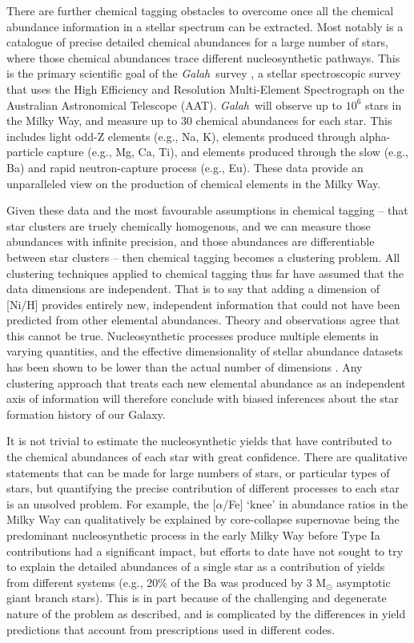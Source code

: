 \documentclass[twocolumn]{aastex62}
\newcommand{\project}[1]{\textsl{#1}}
\newcommand{\Galah}{\project{Galah}}
\begin{document}
There are further chemical tagging obstacles to overcome once all the chemical 
abundance information in a stellar spectrum can be extracted. Most notably is a 
catalogue of precise detailed chemical abundances for a large number of stars,
where those chemical abundances trace different nucleosynthetic pathways.
This is the primary scientific goal of the \Galah\ survey \citep{DeSilva:2015,Martell:2017,Buder:2018},
a stellar spectroscopic survey that uses the High Efficiency and Resolution 
Multi-Element Spectrograph \citep[\project{HERMES};][]{Sheinis:2015} on the Australian 
Astronomical Telescope (AAT).  \Galah\ will observe up to $10^6$ stars in the 
Milky Way, and measure up to 30 chemical abundances for each star. This includes
light odd-Z elements (e.g., Na, K), elements produced through
alpha-particle capture (e.g., Mg, Ca, Ti), and elements produced
through the slow (e.g., Ba) and rapid neutron-capture process
(e.g., Eu). These data provide an unparalleled view on the production
of chemical elements in the Milky Way.


Given these data and the most favourable assumptions in chemical tagging 
-- that star clusters are truely chemically homogenous, and we can measure 
those abundances with infinite precision, and those abundances are 
differentiable between star clusters -- then chemical
tagging becomes a clustering problem. All clustering techniques applied to 
chemical tagging thus far have assumed that the data dimensions are independent. That is to say
that adding a dimension of [Ni/H] provides entirely new, independent information
that could not have been predicted from other elemental abundances.
Theory and observations agree that this cannot be true.
Nucleosynthetic processes produce multiple elements in varying
quantities, and the effective dimensionality of stellar abundance datasets has been shown
to be lower than the actual number of dimensions \citep{Price-Jones:2018}.
Any clustering approach that treats each new elemental abundance as an 
independent axis of information will therefore conclude with biased inferences
about the star formation history of our Galaxy. 


It is not trivial to estimate
the nucleosynthetic yields that have contributed to the chemical abundances of each star
with great confidence. There are
qualitative statements that can be made for large numbers of stars, or particular
types of stars, but quantifying the precise contribution of different processes
to each star is an unsolved problem. For example, the [$\alpha$/Fe] `knee' in
abundance ratios in the Milky Way can qualitatively be explained by 
core-collapse supernovae being the predominant nucleosynthetic process in the
early Milky Way before Type Ia contributions had a significant impact, but 
efforts to date have not sought to try to explain the detailed abundances of a 
single star as a contribution of yields from different systems (e.g., 20\% of the
Ba was produced by 3 M$_\odot$ asymptotic giant branch stars). This is in part 
because of the challenging and degenerate nature of the problem as described, 
and is complicated by the differences in yield predictions that account from 
prescriptions used in different codes.
\end{document}
